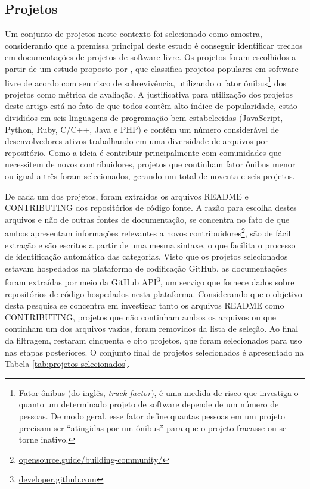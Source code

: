 \subsection{Projetos}
\label{sec:projetos}
Um conjunto de projetos neste contexto foi selecionado como amostra, considerando que a premissa principal deste estudo é conseguir identificar trechos em documentações de projetos de software livre. Os projetos foram escolhidos a partir de um estudo proposto por \citet{avelino2015truck}, que classifica projetos populares em software livre de acordo com seu risco de sobrevivência, utilizando o fator ônibus\footnote{Fator ônibus (do inglês, \textit{truck factor}), é uma medida de risco que investiga o quanto um determinado projeto de software depende de um número de pessoas. De modo geral, esse fator define quantas pessoas em um projeto precisam ser  ``atingidas por um ônibus'' para que o projeto fracasse ou se torne inativo.} dos projetos como métrica de avaliação. A justificativa para utilização dos projetos deste artigo está no fato de que todos contêm alto índice de popularidade, estão divididos em seis linguagens de programação bem estabelecidas (JavaScript, Python, Ruby, C/C++, Java e PHP) e contêm um número considerável de desenvolvedores ativos trabalhando em uma diversidade de arquivos por repositório. Como a ideia é contribuir principalmente com comunidades que necessitem de novos contribuidores, projetos que continham fator ônibus menor ou igual a três foram selecionados, gerando um total de noventa e seis projetos. 

De cada um dos projetos, foram extraídos os arquivos README e CONTRIBUTING dos repositórios de código fonte. A razão para escolha destes arquivos e não de outras fontes de documentação, se concentra no fato de que ambos apresentam informações relevantes a novos contribuidores\footnote{\url{opensource.guide/building-community/}}, são de fácil extração e são escritos a partir de uma mesma sintaxe, o que facilita o processo de identificação automática das categorias. Visto que os projetos selecionados estavam hospedados na plataforma de codificação GitHub, as documentações foram extraídas por meio da GitHub API\footnote{\url{developer.github.com}}, um serviço que fornece dados sobre repositórios de código hospedados nesta plataforma. Considerando que o objetivo desta pesquisa se concentra em investigar tanto os arquivos README como CONTRIBUTING, projetos que não continham ambos os arquivos ou que continham um dos arquivos vazios, foram removidos da lista de seleção. Ao final da filtragem, restaram cinquenta e oito projetos, que foram selecionados para uso nas etapas posteriores. O conjunto final de projetos selecionados é apresentado na Tabela \ref{tab:projetos-selecionados}.

